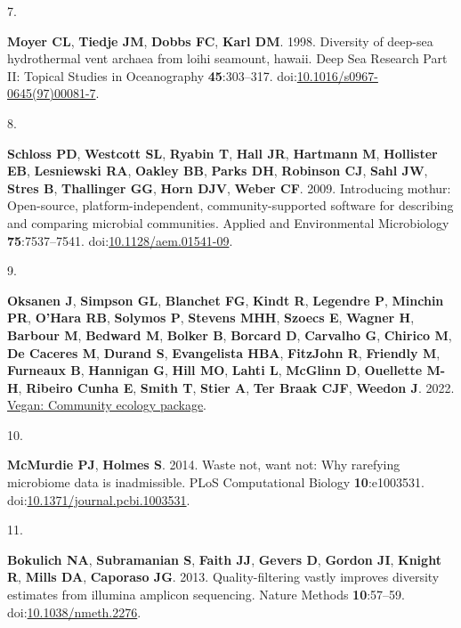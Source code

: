 \documentclass[
]{article}
\newlength{\cslhangindent}
\newlength{\csllabelwidth}
\newlength{\cslentryspacingunit} %
\newenvironment{CSLReferences}[2] %
 {%
  \setlength{\parindent}{0pt}
  \ifodd #1
  \let\oldpar\par
  \def\par{\hangindent=\cslhangindent\oldpar}
  \fi
  \setlength{\parskip}{#2\cslentryspacingunit}
 }%
 {}
\newcommand{\CSLLeftMargin}[1]{\parbox[t]{\csllabelwidth}{#1}}
\newcommand{\CSLRightInline}[1]{\parbox[t]{\linewidth - \csllabelwidth}{#1}\break}
\begin{document}
\begin{CSLReferences}{0}{1}
\leavevmode{}%
\CSLLeftMargin{7. }%
\CSLRightInline{\textbf{Moyer CL}, \textbf{Tiedje JM}, \textbf{Dobbs
FC}, \textbf{Karl DM}. 1998. Diversity of deep-sea hydrothermal vent
archaea from loihi seamount, hawaii. Deep Sea Research Part {II}:
Topical Studies in Oceanography \textbf{45}:303--317.
doi:\href{https://doi.org/10.1016/s0967-0645(97)00081-7}{10.1016/s0967-0645(97)00081-7}.}

\leavevmode{}%
\CSLLeftMargin{8. }%
\CSLRightInline{\textbf{Schloss PD}, \textbf{Westcott SL},
\textbf{Ryabin T}, \textbf{Hall JR}, \textbf{Hartmann M},
\textbf{Hollister EB}, \textbf{Lesniewski RA}, \textbf{Oakley BB},
\textbf{Parks DH}, \textbf{Robinson CJ}, \textbf{Sahl JW}, \textbf{Stres
B}, \textbf{Thallinger GG}, \textbf{Horn DJV}, \textbf{Weber CF}. 2009.
Introducing mothur: Open-source, platform-independent,
community-supported software for describing and comparing microbial
communities. Applied and Environmental Microbiology
\textbf{75}:7537--7541.
doi:\href{https://doi.org/10.1128/aem.01541-09}{10.1128/aem.01541-09}.}

\leavevmode{}%
\CSLLeftMargin{9. }%
\CSLRightInline{\textbf{Oksanen J}, \textbf{Simpson GL},
\textbf{Blanchet FG}, \textbf{Kindt R}, \textbf{Legendre P},
\textbf{Minchin PR}, \textbf{O'Hara RB}, \textbf{Solymos P},
\textbf{Stevens MHH}, \textbf{Szoecs E}, \textbf{Wagner H},
\textbf{Barbour M}, \textbf{Bedward M}, \textbf{Bolker B},
\textbf{Borcard D}, \textbf{Carvalho G}, \textbf{Chirico M}, \textbf{De
Caceres M}, \textbf{Durand S}, \textbf{Evangelista HBA},
\textbf{FitzJohn R}, \textbf{Friendly M}, \textbf{Furneaux B},
\textbf{Hannigan G}, \textbf{Hill MO}, \textbf{Lahti L}, \textbf{McGlinn
D}, \textbf{Ouellette M-H}, \textbf{Ribeiro Cunha E}, \textbf{Smith T},
\textbf{Stier A}, \textbf{Ter Braak CJF}, \textbf{Weedon J}. 2022.
\href{https://CRAN.R-project.org/package=vegan}{Vegan: Community ecology
package}.}

\leavevmode{}%
\CSLLeftMargin{10. }%
\CSLRightInline{\textbf{McMurdie PJ}, \textbf{Holmes S}. 2014. Waste
not, want not: Why rarefying microbiome data is inadmissible. {PLoS}
Computational Biology \textbf{10}:e1003531.
doi:\href{https://doi.org/10.1371/journal.pcbi.1003531}{10.1371/journal.pcbi.1003531}.}

\leavevmode{}%
\CSLLeftMargin{11. }%
\CSLRightInline{\textbf{Bokulich NA}, \textbf{Subramanian S},
\textbf{Faith JJ}, \textbf{Gevers D}, \textbf{Gordon JI}, \textbf{Knight
R}, \textbf{Mills DA}, \textbf{Caporaso JG}. 2013. Quality-filtering
vastly improves diversity estimates from illumina amplicon sequencing.
Nature Methods \textbf{10}:57--59.
doi:\href{https://doi.org/10.1038/nmeth.2276}{10.1038/nmeth.2276}.}


\end{CSLReferences}
\end{document}
